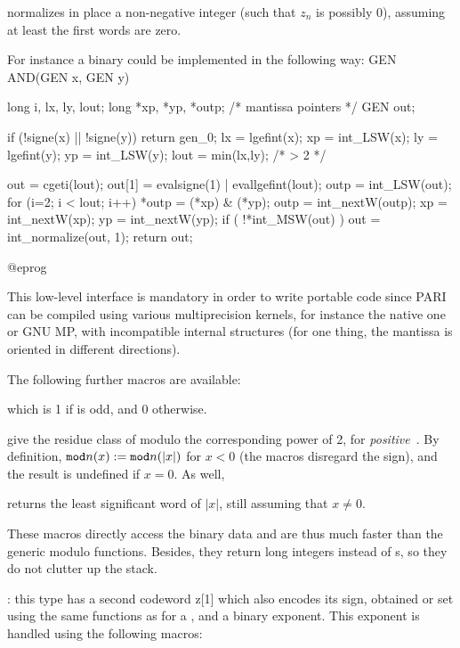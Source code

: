 \noindent normalizes in place a non-negative integer (such that $z_n$ is
possibly $0$), assuming at least the first  words are zero.

\noindent For instance a binary  could be implemented in the
following way:
\bprog
GEN AND(GEN x, GEN y) {
  long i, lx, ly, lout;
  long *xp, *yp, *outp; /* mantissa pointers */
  GEN out;

  if (!signe(x) || !signe(y)) return gen_0;
  lx = lgefint(x); xp = int_LSW(x);
  ly = lgefint(y); yp = int_LSW(y); lout = min(lx,ly); /* > 2 */

  out = cgeti(lout); out[1] = evalsigne(1) | evallgefint(lout);
  outp = int_LSW(out);
  for (i=2; i < lout; i++)
  {
    *outp = (*xp) & (*yp);
    outp  = int_nextW(outp);
    xp    = int_nextW(xp);
    yp    = int_nextW(yp);
  }
  if ( !*int_MSW(out) ) out = int_normalize(out, 1);
  return out;
}
@eprog

\noindent This low-level interface is mandatory in order to write portable
code since PARI can be compiled using various multiprecision kernels, for
instance the native one or GNU MP, with incompatible internal structures
(for one thing, the mantissa is oriented in different directions).

\noindent The following further macros are available:

 which is 1 if  is odd, and 0 otherwise.






 give the residue class of  modulo the
corresponding power of 2, for \emph{positive}~. By definition,
${\tt mod}n(x) := {\tt mod}n(|x|)$ for $x < 0$ (the macros disregard the
sign), and the result is undefined if $x = 0$. As well,

 returns the least significant word of $|x|$, still
assuming that $x\neq 0$.

These macros directly access the binary data and are thus much faster than
the generic modulo functions. Besides, they return long integers instead of
s, so they do not clutter up the stack.

:
this type has a second codeword z[1] which also encodes its sign, obtained
or set using the same functions as for a , and a binary exponent.
This exponent is handled using the following macros:

